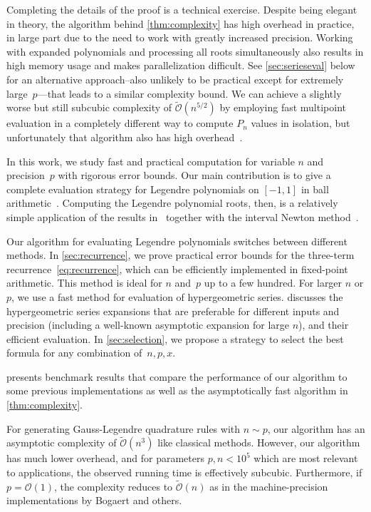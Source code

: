 \documentclass[nohypdvips,review]{siamart0216}
\newcommand{\OO}{\mathcal{O}}
\newcommand{\OOtilde}{\widetilde{\mathcal{O}}}
\begin{document}
Completing the details
of the proof is a technical exercise.
Despite being elegant in theory,
the algorithm behind \cref{thm:complexity} has high overhead
in practice, in large part due to the need to work
with greatly increased precision.
Working with expanded polynomials and
processing all roots simultaneously also results in high memory usage and
makes parallelization difficult.
See \cref{sec:serieseval} below for an alternative approach--also
unlikely to be practical except for extremely large~$p$---that leads to a
similar complexity bound.
We can achieve a slightly worse but still subcubic
complexity of $\OOtilde(n^{5/2})$
by employing
fast multipoint evaluation in a completely different way
to compute $P_n$ values in isolation,
but unfortunately that algorithm
also has high overhead~\cite{Johansson2014rectangular}.

In this work, we study fast and practical computation for variable $n$
and precision~$p$ with rigorous error bounds.
Our main contribution is to give a complete evaluation strategy
for Legendre polynomials on $[-1,1]$ in ball arithmetic~\cite{vdH:ball,Johansson2017arb}.
Computing the Legendre polynomial roots, then,
is a relatively simple application of the results
in~\cite{petras1999computation} together with
the interval Newton method~\cite{moore1979methods}.

Our algorithm for evaluating Legendre polynomials switches between
different methods.
In \cref{sec:recurrence}, we prove practical error bounds for
the three-term recurrence~\cref{eq:recurrence}, which can be
efficiently implemented in fixed-point arithmetic.
This method is ideal for $n$ and~$p$ up to a few hundred.
For larger $n$ or $p$, we use a fast method for evaluation
of hypergeometric series.
 discusses the hypergeometric series
expansions that are preferable for different inputs and precision
(including a well-known asymptotic expansion for large $n$),
and their efficient evaluation.
In \cref{sec:selection}, we propose a strategy to select the
best formula for any combination of~$n, p, x$.

 presents benchmark results
that compare the performance
of our algorithm
to some previous implementations
as well as the asymptotically fast algorithm in \cref{thm:complexity}.

For generating Gauss-Legendre quadrature rules with $n \sim p$,
our algorithm has an asymptotic complexity of $\OOtilde(n^3)$ like
classical methods. However, our algorithm has much lower overhead,
and for parameters $p, n < 10^5$ which are most relevant to applications,
the observed running time is effectively subcubic.
Furthermore, if $p = \OO(1)$, the complexity reduces to $\OOtilde(n)$
as in the machine-precision implementations by Bogaert and others.
\end{document}
